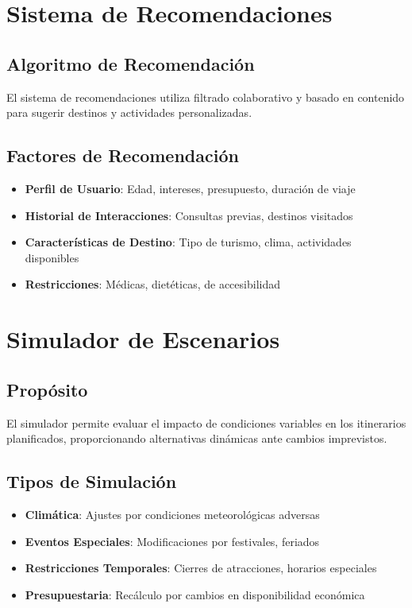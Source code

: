 \documentclass[runningheads]{llncs}
\begin{document}
\section{Sistema de Recomendaciones}

\subsection{Algoritmo de Recomendación}

El sistema de recomendaciones utiliza filtrado colaborativo y basado en contenido para sugerir destinos y actividades personalizadas.


\subsection{Factores de Recomendación}

\begin{itemize}
\item \textbf{Perfil de Usuario}: Edad, intereses, presupuesto, duración de viaje
\item \textbf{Historial de Interacciones}: Consultas previas, destinos visitados
\item \textbf{Características de Destino}: Tipo de turismo, clima, actividades disponibles
\item \textbf{Restricciones}: Médicas, dietéticas, de accesibilidad
\end{itemize}

\section{Simulador de Escenarios}

\subsection{Propósito}

El simulador permite evaluar el impacto de condiciones variables en los itinerarios planificados, proporcionando alternativas dinámicas ante cambios imprevistos.

\subsection{Tipos de Simulación}

\begin{itemize}
\item \textbf{Climática}: Ajustes por condiciones meteorológicas adversas
\item \textbf{Eventos Especiales}: Modificaciones por festivales, feriados
\item \textbf{Restricciones Temporales}: Cierres de atracciones, horarios especiales
\item \textbf{Presupuestaria}: Recálculo por cambios en disponibilidad económica
\end{itemize}
\end{document}
